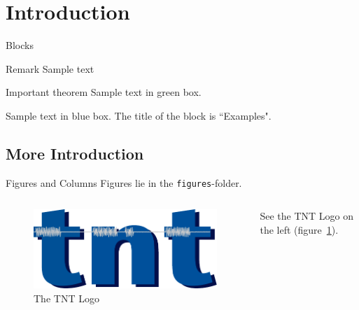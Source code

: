 \rendertitlepage

\rendertocframe[Outline]

\section{Introduction}
\begin{frame}{Blocks}
\begin{block}{Remark}
Sample text
\end{block}

\begin{alertblock}{Important theorem}
Sample text in green box.
\end{alertblock}

\begin{examples}
Sample text in blue box. The title of the block is ``Examples".
\end{examples}
    
\end{frame}

\subsection{More Introduction}
\begin{frame}{Figures and Columns}
Figures lie in the \texttt{figures}-folder.

\vspace{0.5cm}
\begin{columns}
    \begin{column}{0.3\textwidth}
        \begin{figure}
            \centering
            \includegraphics[width=1\textwidth, height=1\textheight, keepaspectratio]{figures/TNT_darkv4.pdf}
            \caption{The TNT Logo}
            \label{fig:tnt_logo}
        \end{figure}
    \end{column}
    
    \begin{column}{0.7\textwidth}
    See the TNT Logo on the left (figure~\ref{fig:tnt_logo}).
    \blindtext
    \end{column}
\end{columns}
\end{frame}

